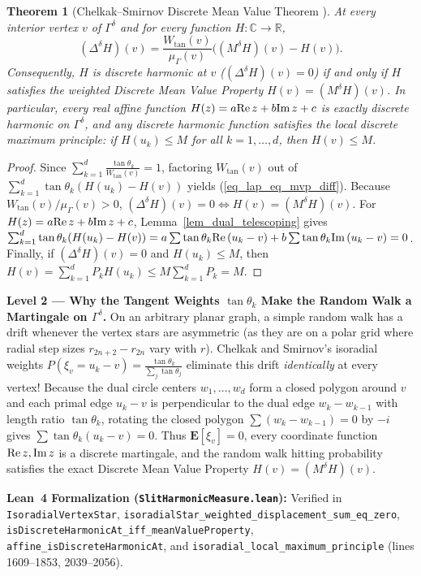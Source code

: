 \documentclass[11pt,reqno]{amsart}
\newtheorem{thm}{Theorem}[section]
\numberwithin{equation}{section}
\newcommand{\R}{\mathbb{R}}
\newcommand{\C}{\mathbb{C}}
\newcommand{\re}{\mbox{\rm Re\,}}
\newcommand{\im}{\mbox{\rm Im\,}}
\begin{document}
\begin{thm}[Chelkak--Smirnov Discrete Mean Value Theorem {\cite[p.~1593]{CS}}] \label{thm_discrete_mvt}
At every interior vertex $v$ of $\varGamma^{\delta}$ and for every function $H : \C \to \R$,
\begin{equation} \label{eq_lap_eq_mvp_diff}
  (\Delta^{\delta} H)(v) = \frac{W_{\tan}(v)}{\mu_{\varGamma}(v)} \bigl((M^{\delta} H)(v) - H(v)\bigr).
\end{equation}
Consequently, $H$ is discrete harmonic at $v$ ($(\Delta^{\delta} H)(v) = 0$) if and only if $H$ satisfies the weighted Discrete Mean Value Property $H(v) = (M^{\delta} H)(v)$. In particular, every real affine function $H(z) = a\re z + b\im z + c$ is exactly discrete harmonic on $\varGamma^{\delta}$, and any discrete harmonic function satisfies the local discrete maximum principle: if $H(u_k) \le M$ for all $k = 1, \dots, d$, then $H(v) \le M$.
\end{thm}
\begin{proof}
Since $\sum_{k=1}^d \frac{\tan\theta_k}{W_{\tan}(v)} = 1$, factoring $W_{\tan}(v)$ out of $\sum_{k=1}^d \tan\theta_k(H(u_k) - H(v))$ yields (\ref{eq_lap_eq_mvp_diff}). Because $W_{\tan}(v) / \mu_{\varGamma}(v) > 0$, $(\Delta^{\delta} H)(v) = 0 \iff H(v) = (M^{\delta} H)(v)$. For $H(z) = a\re z + b\im z + c$, Lemma~\ref{lem_dual_telescoping} gives $\sum_{k=1}^d \tan\theta_k(H(u_k) - H(v)) = a\sum \tan\theta_k\re(u_k - v) + b\sum \tan\theta_k\im(u_k - v) = 0$. Finally, if $(\Delta^{\delta} H)(v) = 0$ and $H(u_k) \le M$, then $H(v) = \sum_{k=1}^d P_k H(u_k) \le M \sum_{k=1}^d P_k = M$.
\end{proof}

\begin{leveltwo}
\noindent\textbf{\textcolor{l2border}{Level 2 --- Why the Tangent Weights $\tan\theta_k$ Make the Random Walk a Martingale on $\varGamma^{\delta}$.}}
On an arbitrary planar graph, a simple random walk has a drift whenever the vertex stars are asymmetric (as they are on a polar grid where radial step sizes $r_{2n+2} - r_{2n}$ vary with $r$). Chelkak and Smirnov's isoradial weights $P(\xi_v = u_k - v) = \frac{\tan\theta_k}{\sum_j \tan\theta_j}$ eliminate this drift \emph{identically} at every vertex! Because the dual circle centers $w_1, \dots, w_d$ form a closed polygon around $v$ and each primal edge $u_k - v$ is perpendicular to the dual edge $w_k - w_{k-1}$ with length ratio $\tan\theta_k$, rotating the closed polygon $\sum (w_k - w_{k-1}) = 0$ by $-i$ gives $\sum \tan\theta_k(u_k - v) = 0$. Thus $\mathbf{E}[\xi_v] = 0$, every coordinate function $\re z, \im z$ is a discrete martingale, and the random walk hitting probability satisfies the exact Discrete Mean Value Property $H(v) = (M^{\delta} H)(v)$.

\smallskip
\noindent\textbf{\textcolor{leannote}{Lean~4 Formalization (\texttt{SlitHarmonicMeasure.lean}):}} Verified in \texttt{IsoradialVertexStar}, \texttt{isoradialStar\_weighted\_displacement\_sum\_eq\_zero}, \texttt{isDiscreteHarmonicAt\_iff\_meanValueProperty}, \texttt{affine\_isDiscreteHarmonicAt}, and \texttt{isoradial\_local\_maximum\_principle} (lines 1609--1853, 2039--2056).
\end{leveltwo}
\end{document}
